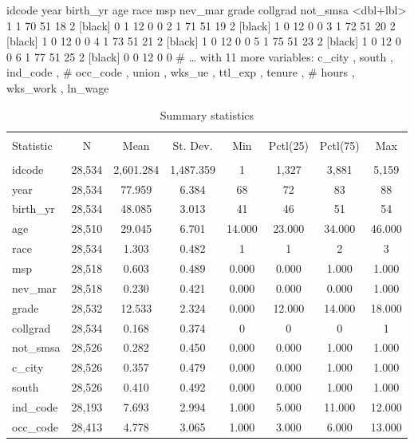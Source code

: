 \documentclass[
  12pt,
]{article}
\begin{document}
idcode year birth\_yr age race msp nev\_mar grade collgrad not\_smsa
\textless dbl+lbl\textgreater{}
1 1 70 51 18 2 {[}black{]} 0 1 12 0 0
2 1 71 51 19 2 {[}black{]} 1 0 12 0 0
3 1 72 51 20 2 {[}black{]} 1 0 12 0 0
4 1 73 51 21 2 {[}black{]} 1 0 12 0 0
5 1 75 51 23 2 {[}black{]} 1 0 12 0 0
6 1 77 51 25 2 {[}black{]} 0 0 12 0 0
\# \ldots{} with 11 more variables: c\_city , south , ind\_code ,
\# occ\_code , union , wks\_ue , ttl\_exp , tenure ,
\# hours , wks\_work , ln\_wage

\begin{table}[ht] \centering 
  \caption{Summary statistics} 
  \label{tab1} 
\begin{tabular}{@{\extracolsep{5pt}}lccccccc} 
\\[-1.8ex]\hline 
\hline \\[-1.8ex] 
Statistic & \multicolumn{1}{c}{N} & \multicolumn{1}{c}{Mean} & \multicolumn{1}{c}{St. Dev.} & \multicolumn{1}{c}{Min} & \multicolumn{1}{c}{Pctl(25)} & \multicolumn{1}{c}{Pctl(75)} & \multicolumn{1}{c}{Max} \\ 
\hline \\[-1.8ex] 
idcode & 28,534 & 2,601.284 & 1,487.359 & 1 & 1,327 & 3,881 & 5,159 \\ 
year & 28,534 & 77.959 & 6.384 & 68 & 72 & 83 & 88 \\ 
birth\_yr & 28,534 & 48.085 & 3.013 & 41 & 46 & 51 & 54 \\ 
age & 28,510 & 29.045 & 6.701 & 14.000 & 23.000 & 34.000 & 46.000 \\ 
race & 28,534 & 1.303 & 0.482 & 1 & 1 & 2 & 3 \\ 
msp & 28,518 & 0.603 & 0.489 & 0.000 & 0.000 & 1.000 & 1.000 \\ 
nev\_mar & 28,518 & 0.230 & 0.421 & 0.000 & 0.000 & 0.000 & 1.000 \\ 
grade & 28,532 & 12.533 & 2.324 & 0.000 & 12.000 & 14.000 & 18.000 \\ 
collgrad & 28,534 & 0.168 & 0.374 & 0 & 0 & 0 & 1 \\ 
not\_smsa & 28,526 & 0.282 & 0.450 & 0.000 & 0.000 & 1.000 & 1.000 \\ 
c\_city & 28,526 & 0.357 & 0.479 & 0.000 & 0.000 & 1.000 & 1.000 \\ 
south & 28,526 & 0.410 & 0.492 & 0.000 & 0.000 & 1.000 & 1.000 \\ 
ind\_code & 28,193 & 7.693 & 2.994 & 1.000 & 5.000 & 11.000 & 12.000 \\ 
occ\_code & 28,413 & 4.778 & 3.065 & 1.000 & 3.000 & 6.000 & 13.000 \\ 

\end{tabular}
\end{table}
\end{document}

